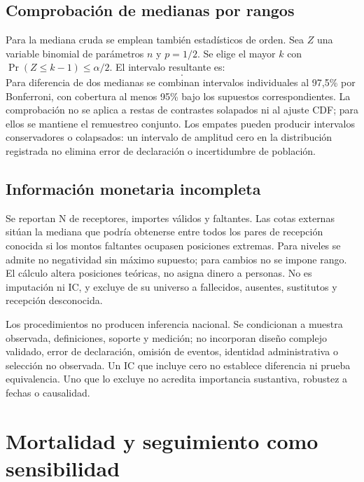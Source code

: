 \subsection{Comprobación de medianas por rangos}

Para la mediana cruda se emplean también estadísticos de orden.
Sea $Z$ una variable binomial de parámetros $n$ y $p=1/2$.
Se elige el mayor $k$ con
$\Pr(Z\leq k-1)\leq\alpha/2$. El intervalo resultante es:
\begin{equation}
 [X_{(k)},X_{(n-k+1)}].
 \label{eq:ic-orden}
\end{equation}
Para diferencia de dos medianas se combinan intervalos individuales al 97,5\%
por Bonferroni, con cobertura al menos 95\% bajo los supuestos correspondientes.
La comprobación no se aplica a restas de contrastes solapados ni al ajuste
CDF; para ellos se mantiene el remuestreo conjunto. Los empates pueden
producir intervalos conservadores o colapsados: un intervalo de amplitud
cero en la distribución registrada no elimina error de declaración o
incertidumbre de población.

\subsection{Información monetaria incompleta}

Se reportan N de receptores, importes válidos y faltantes. Las cotas externas
sitúan la mediana que podría obtenerse entre todos los pares de recepción
conocida si los montos faltantes ocupasen posiciones extremas. Para niveles
se admite no negatividad sin máximo supuesto; para cambios no se impone
rango. El cálculo altera posiciones teóricas, no asigna dinero a personas.
No es imputación ni IC, y excluye de su universo a fallecidos, ausentes,
sustitutos y recepción desconocida.

Los procedimientos no producen inferencia nacional. Se condicionan a
muestra observada, definiciones, soporte y medición; no incorporan diseño
complejo validado, error de declaración, omisión de eventos, identidad
administrativa o selección no observada. Un IC que incluye cero no establece
diferencia ni prueba equivalencia. Uno que lo excluye no acredita importancia
sustantiva, robustez a fechas o causalidad.

\section{Mortalidad y seguimiento como sensibilidad}
\label{sec:seleccion-actuarial}

